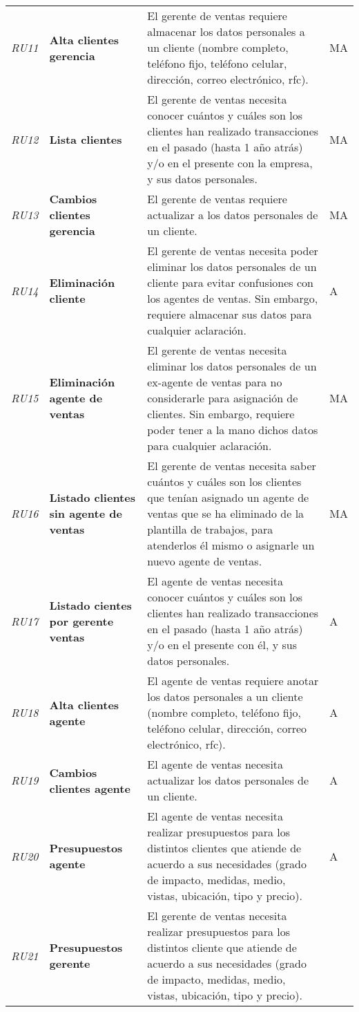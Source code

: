 \begin{longtable}[H]{m{1cm}m{3cm}m{10cm}m{1cm}}
\textit{RU11} &\textbf{Alta clientes gerencia} & El gerente de ventas requiere almacenar los datos personales a un cliente (nombre completo, teléfono fijo, teléfono celular, dirección, correo electrónico, rfc). & MA\tabularnewline
\textit{RU12} &\textbf{Lista clientes} & El gerente de ventas necesita conocer cuántos y cuáles son los clientes han realizado transacciones en el pasado (hasta 1 año atrás) y/o en el presente con la empresa, y sus datos personales.  & MA\tabularnewline
\textit{RU13} &\textbf{Cambios clientes gerencia} & El gerente de ventas requiere actualizar a los datos personales de un cliente. & MA\tabularnewline
\textit{RU14} &\textbf{Eliminación cliente} & El gerente de ventas necesita poder eliminar los datos personales de un cliente para evitar confusiones con los agentes de ventas. Sin embargo, requiere almacenar sus datos para cualquier aclaración. & A\tabularnewline
\textit{RU15} &\textbf{Eliminación agente de ventas} & El gerente de ventas necesita eliminar los datos personales de un ex-agente de ventas para no considerarle para asignación de clientes. Sin embargo, requiere poder tener a la mano dichos datos para cualquier aclaración. & MA\tabularnewline
\textit{RU16} &\textbf{Listado clientes sin agente de ventas} & El gerente de ventas necesita saber cuántos y cuáles son los clientes que tenían asignado un agente de ventas que se ha eliminado de la plantilla de trabajos, para atenderlos él mismo o asignarle un nuevo agente de ventas. & MA\tabularnewline
\textit{RU17} &\textbf{Listado cientes por gerente ventas} & El agente de ventas necesita conocer cuántos y cuáles son los clientes han realizado transacciones en el pasado (hasta 1 año atrás) y/o en el presente con él, y sus datos personales. & A\tabularnewline
\textit{RU18} &\textbf{Alta clientes agente} & El agente de ventas requiere anotar los datos personales a un cliente (nombre completo, teléfono fijo, teléfono celular, dirección, correo electrónico, rfc). & A\tabularnewline
\textit{RU19} &\textbf{Cambios clientes agente} & El agente de ventas necesita actualizar los datos personales de un cliente. & A\tabularnewline
\textit{RU20} &\textbf{Presupuestos agente} & El agente de ventas necesita realizar presupuestos para los distintos clientes que atiende de acuerdo a sus necesidades (grado de impacto, medidas, medio, vistas, ubicación, tipo y precio). & A\tabularnewline
\textit{RU21} &\textbf{Presupuestos gerente} & El gerente de ventas necesita realizar presupuestos para los distintos cliente que atiende de acuerdo a sus necesidades (grado de impacto, medidas, medio, vistas, ubicación, tipo y precio). &\tabularnewline

\end{longtable}
